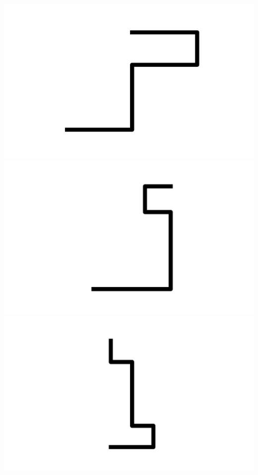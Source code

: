 \documentclass[]{report}
\begin{document}
\includegraphics[scale=.1]{pictures/21/state_cluster_shapes_301.pdf} 
\includegraphics[scale=.1]{pictures/21/state_cluster_shapes_302.pdf} 
\includegraphics[scale=.1]{pictures/21/state_cluster_shapes_303.pdf} 
\end{document}
